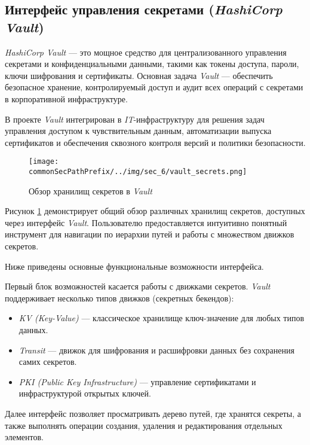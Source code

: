 \subsection{Интерфейс управления секретами (\textit{HashiCorp Vault})}

\textit{HashiCorp Vault} — это мощное средство для централизованного управления секретами и конфиденциальными данными, такими как токены доступа, пароли, ключи шифрования и сертификаты. Основная задача \textit{Vault} — обеспечить безопасное хранение, контролируемый доступ и аудит всех операций с секретами в корпоративной инфраструктуре.

В проекте \textit{Vault} интегрирован в \textit{IT}-инфраструктуру для решения задач управления доступом к чувствительным данным, автоматизации выпуска сертификатов и обеспечения сквозного контроля версий и политики безопасности.

\begin{figure}[ht]
    \centering
    \texttt{[image: \\commonSecPathPrefix/../img/sec\_6/vault\_secrets.png]}
    \caption{Обзор хранилищ секретов в \textit{Vault}}
    \label{fig:user_guide:vault_secrets}
\end{figure}

Рисунок \ref{fig:user_guide:vault_secrets} демонстрирует общий обзор различных хранилищ секретов, доступных через интерфейс \textit{Vault}. Пользователю предоставляется интуитивно понятный инструмент для навигации по иерархии путей и работы с множеством движков секретов.

Ниже приведены основные функциональные возможности интерфейса.

Первый блок возможностей касается работы с движками секретов. \textit{Vault} поддерживает несколько типов движков (секретных бекендов):

\begin{itemize}
    \item \textit{KV (Key-Value)} — классическое хранилище ключ-значение для любых типов данных.
    \item \textit{Transit} — движок для шифрования и расшифровки данных без сохранения самих секретов.
    \item \textit{PKI (Public Key Infrastructure)} — управление сертификатами и инфраструктурой открытых ключей.
\end{itemize}

Далее интерфейс позволяет просматривать дерево путей, где хранятся секреты, а также выполнять операции создания, удаления и редактирования отдельных элементов.

